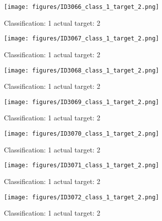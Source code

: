 \begin{figure}[h!]
\begin{center}
\texttt{[image: figures/ID3066\_class\_1\_target\_2.png]}
\end{center}
\caption{ Classification: 1 actual target: 2}
\label{fig:ID3066_class_1_target_2}
\end{figure}
\begin{figure}[h!]
\begin{center}
\texttt{[image: figures/ID3067\_class\_1\_target\_2.png]}
\end{center}
\caption{ Classification: 1 actual target: 2}
\label{fig:ID3067_class_1_target_2}
\end{figure}
\begin{figure}[h!]
\begin{center}
\texttt{[image: figures/ID3068\_class\_1\_target\_2.png]}
\end{center}
\caption{ Classification: 1 actual target: 2}
\label{fig:ID3068_class_1_target_2}
\end{figure}
\begin{figure}[h!]
\begin{center}
\texttt{[image: figures/ID3069\_class\_1\_target\_2.png]}
\end{center}
\caption{ Classification: 1 actual target: 2}
\label{fig:ID3069_class_1_target_2}
\end{figure}
\begin{figure}[h!]
\begin{center}
\texttt{[image: figures/ID3070\_class\_1\_target\_2.png]}
\end{center}
\caption{ Classification: 1 actual target: 2}
\label{fig:ID3070_class_1_target_2}
\end{figure}
\begin{figure}[h!]
\begin{center}
\texttt{[image: figures/ID3071\_class\_1\_target\_2.png]}
\end{center}
\caption{ Classification: 1 actual target: 2}
\label{fig:ID3071_class_1_target_2}
\end{figure}
\begin{figure}[h!]
\begin{center}
\texttt{[image: figures/ID3072\_class\_1\_target\_2.png]}
\end{center}
\caption{ Classification: 1 actual target: 2}
\label{fig:ID3072_class_1_target_2}
\end{figure}

